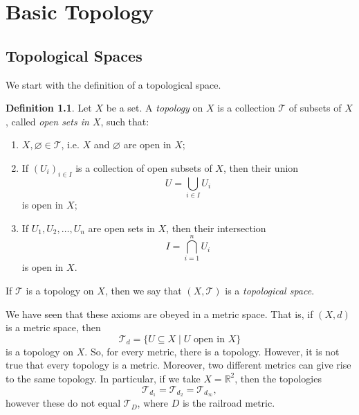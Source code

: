 \documentclass[a4paper, openany]{memoir}
\theoremstyle{definition}
\newtheorem{definition}{Definition}[section]
\theoremstyle{plain}
\begin{document}
\chapter{Basic Topology}
\section{Topological Spaces}
We start with the definition of a topological space.
\begin{definition}
Let $X$ be a set. A \emph{topology} on $X$ is a collection $\mathcal{T}$ of subsets of $X$, called \emph{open sets in $X$}, such that:
\begin{enumerate}[label=\textbf{T\arabic*}.]
    \item $X, \varnothing \in \mathcal{T}$, i.e. $X$ and $\varnothing$ are open in $X$;
    
    \item If $(U_i)_{i \in I}$ is a collection of open subsets of $X$, then their union
    \[U = \bigcup_{i \in I} U_i\]
    is open in $X$;
    
    \item If $U_1, U_2, \dots, U_n$ are open sets in $X$, then their intersection
    \[I = \bigcap_{i = 1}^n U_i\]
    is open in $X$.
\end{enumerate}
If $\mathcal{T}$ is a topology on $X$, then we say that $(X, \mathcal{T})$ is a \emph{topological space}.
\end{definition}
\noindent We have seen that these axioms are obeyed in a metric space. That is, if $(X, d)$ is a metric space, then
\[\mathcal{T}_d = \{U \subseteq X \mid U \text{ open in } X\}\]
is a topology on $X$. So, for every metric, there is a topology. However, it is not true that every topology is a metric. Moreover, two different metrics can give rise to the same topology. In particular, if we take $X = \mathbb{R}^2$, then the topologies
\[\mathcal{T}_{d_1} = \mathcal{T}_{d_2} = \mathcal{T}_{d_\infty},\]
however these do not equal $\mathcal{T}_{D}$, where $D$ is the railroad metric.
\end{document}
